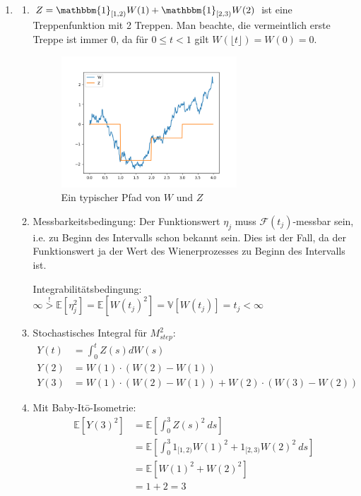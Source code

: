 \documentclass[a4paper,11pt,notitlepage,fullpage]{article}
\newcommand{\E}{\mathbb E}
\newcommand{\V}{\mathbb V}
\newcommand{\ind}{\mathbbm{1}}
\begin{document}
\begin{enumerate}
\begin{enumerate}
\newpage
\end{enumerate}
\item
\begin{enumerate}
\item $Z = \ind_{[1, 2)} W(1) + \ind_{[2, 3)} W(2)$ ist eine Treppenfunktion mit 2 Treppen. Man beachte, die vermeintlich erste Treppe ist immer 0, da für $0 \leq t < 1$ gilt $W(\lfloor t\rfloor) = W(0) = 0$.
\begin{figure}[h!]
\centering
\includegraphics[width=0.66\textwidth]{gfx/14_fig.png}
\caption{Ein typischer Pfad von $W$ und $Z$}
\end{figure}

\item Messbarkeitsbedingung: Der Funktionswert $\eta_j$ muss $\mathcal F(t_j)$-messbar sein, i.e. zu Beginn des Intervalls schon bekannt sein. Dies ist der Fall, da der Funktionswert ja der Wert des Wienerprozesses zu Beginn des Intervalls ist.

Integrabilitätsbedingung: $\infty \stackrel{!}{>} \E[\eta_j^2] = \E[W(t_j)^2] = \V[W(t_j)] = t_j < \infty$

\item Stochastisches Integral für $M_{step}^2$:
\begin{align*}
Y(t) &= \int_0^t Z(s)dW(s) \\
Y(2) &= W(1) \cdot (W(2) - W(1)) \\
Y(3) &= W(1) \cdot (W(2) - W(1)) + W(2) \cdot (W(3) - W(2))
\end{align*}

\item Mit Baby-Itō-Isometrie:
\begin{align*}
 \E\left[Y(3)^2\right] &= \E\left[\int_0^3 Z(s)^2 ~ds\right] \\
&= \E\left[\int_0^3 1_{[1, 2)} W(1)^2 + 1_{[2, 3)} W(2)^2 ~ds\right] \\
&= \E\left[W(1)^2 + W(2)^2\right] \\
&= 1 + 2 = 3 \\
\end{align*}


\end{enumerate}
\end{enumerate}
\end{document}
